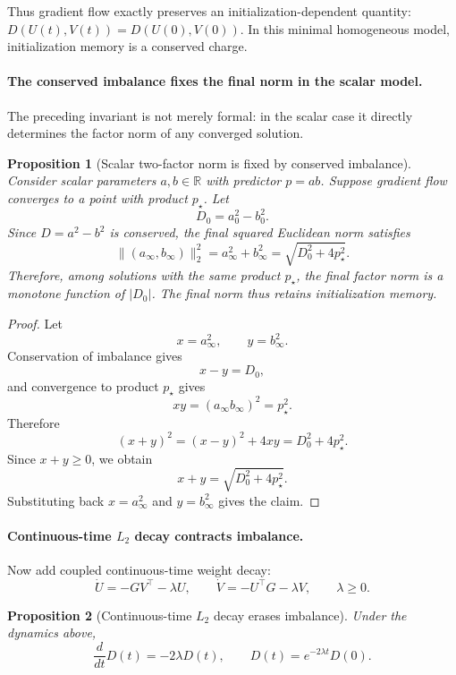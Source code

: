 \documentclass{article}
\newtheorem{proposition}{Proposition}
\newcommand{\R}{\mathbb{R}}
\begin{document}
Thus gradient flow exactly preserves an initialization-dependent
quantity: \(D(U(t),V(t))=D(U(0),V(0))\).  In this minimal homogeneous
model, initialization memory is a conserved charge.

\paragraph{The conserved imbalance fixes the final norm in the scalar model.}
The preceding invariant is not merely formal: in the scalar case it
directly determines the factor norm of any converged solution.

\begin{proposition}[Scalar two-factor norm is fixed by conserved imbalance]
Consider scalar parameters \(a,b\in\R\) with predictor \(p=ab\).  Suppose
gradient flow converges to a point with product \(p_\star\).  Let
\[
    D_0=a_0^2-b_0^2 .
\]
Since \(D=a^2-b^2\) is conserved, the final squared Euclidean norm
satisfies
\[
    \|(a_\infty,b_\infty)\|_2^2
    =
    a_\infty^2+b_\infty^2
    =
    \sqrt{D_0^2+4p_\star^2}.
\]
Therefore, among solutions with the same product \(p_\star\), the final
factor norm is a monotone function of \(|D_0|\).  The final norm thus
retains initialization memory.
\end{proposition}

\begin{proof}
Let
\[
    x=a_\infty^2,
    \qquad
    y=b_\infty^2.
\]
Conservation of imbalance gives
\[
    x-y=D_0,
\]
and convergence to product \(p_\star\) gives
\[
    xy=(a_\infty b_\infty)^2=p_\star^2.
\]
Therefore
\[
    (x+y)^2
    =
    (x-y)^2+4xy
    =
    D_0^2+4p_\star^2.
\]
Since \(x+y\ge0\), we obtain
\[
    x+y=\sqrt{D_0^2+4p_\star^2}.
\]
Substituting back \(x=a_\infty^2\) and \(y=b_\infty^2\) gives the claim.
\end{proof}

\paragraph{Continuous-time \(L_2\) decay contracts imbalance.}
Now add coupled continuous-time weight decay:
\[
    \dot U=-GV^\top-\lambda U,
    \qquad
    \dot V=-U^\top G-\lambda V,
    \qquad
    \lambda\ge0.
\]

\begin{proposition}[Continuous-time \(L_2\) decay erases imbalance]
Under the dynamics above,
\[
    \frac{d}{dt}D(t)=-2\lambda D(t),
    \qquad
    D(t)=e^{-2\lambda t}D(0).
\]
\end{proposition}
\end{document}
